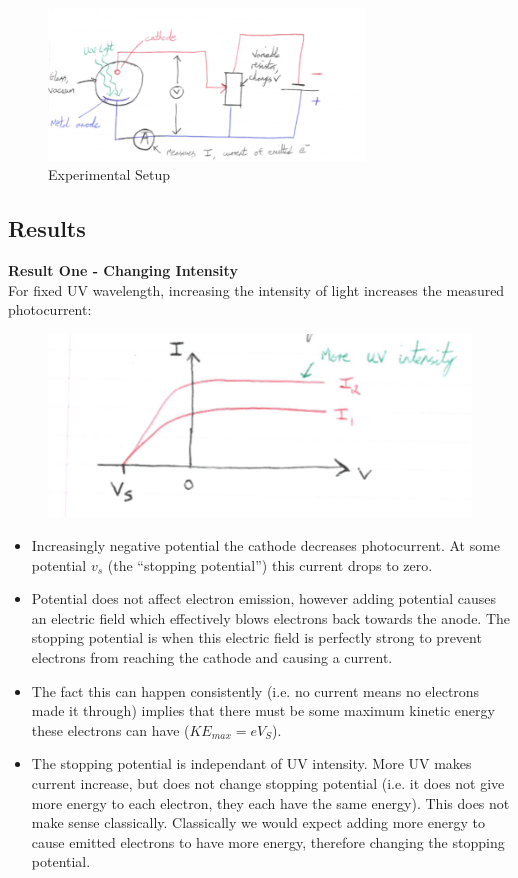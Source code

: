 \begin{figure}[H]
    \centering
    \includegraphics[width=0.75\textwidth]{figures/lec03-02.png}
     \caption{Experimental Setup}
\end{figure}

\subsection*{Results}
\textbf{Result One - Changing Intensity}\\
For fixed UV wavelength, increasing the intensity of light increases the measured photocurrent:
\begin{figure}[H]
    \centering
    \includegraphics{figures/lec03-03.png}
    \caption{}
\end{figure}
\begin{itemize}
    \item Increasingly negative potential the cathode decreases photocurrent. At some potential $v_s$ (the ``stopping potential'') this current drops to zero.
    \item Potential does not affect electron emission, however adding potential causes an electric field which effectively blows electrons back towards the anode. The stopping potential is when this electric field is perfectly strong to prevent electrons from reaching the cathode and causing a current.
    \item The fact this can happen consistently (i.e. no current means no electrons made it through) implies that there must be some maximum kinetic energy these electrons can have ($KE_{max} = eV_S$).
    \item The stopping potential is independant of UV intensity. More UV makes current increase, but does not change stopping potential (i.e. it does not give more energy to each electron, they each have the same energy). This does not make sense classically. Classically we would expect adding more energy to cause emitted electrons to have more energy, therefore changing the stopping potential.
\end{itemize}

